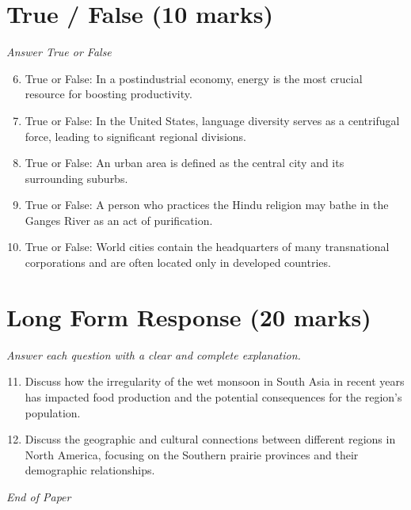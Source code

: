 \documentclass[12pt]{article}
\begin{document}
\section*{True / False (10 marks)}
\textit{Answer True or False}
\begin{enumerate}[label=\arabic*.]
\setcounter{enumi}{5}
\item True or False: In a postindustrial economy, energy is the most crucial resource for boosting productivity.
\item True or False: In the United States, language diversity serves as a centrifugal force, leading to significant regional divisions.
\item True or False: An urban area is defined as the central city and its surrounding suburbs.
\item True or False: A person who practices the Hindu religion may bathe in the Ganges River as an act of purification.
\item True or False: World cities contain the headquarters of many transnational corporations and are often located only in developed countries.
\end{enumerate}

\section*{Long Form Response (20 marks)}
\textit{Answer each question with a clear and complete explanation.}
\begin{enumerate}[label=\arabic*.]
\setcounter{enumi}{10}
\item Discuss how the irregularity of the wet monsoon in South Asia in recent years has impacted food production and the potential consequences for the region's population.
\item Discuss the geographic and cultural connections between different regions in North America, focusing on the Southern prairie provinces and their demographic relationships.
\end{enumerate}

\vfill
\noindent\textit{End of Paper}
\end{document}
